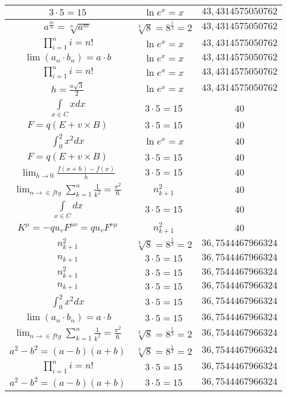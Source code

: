 \documentclass{article}
\begin{document}
\begin{flushleft}
\begin{longtable}{|c|c|c|}
$3\cdot 5=15$ & $\ln e^x=x$ & $43,4314575050762$ \\ \hline 
$a^{\frac{m}{n}}=\sqrt[n]{a^{m}}$ & $\sqrt[3]{8}=8^{\frac{1}{3}}=2$ & $43,4314575050762$ \\ \hline 
$\prod_{i=1}^ni=n!$ & $\ln e^x=x$ & $43,4314575050762$ \\ \hline 
$\lim\left(a_n\cdot b_n\right)=a\cdot b$ & $\ln e^x=x$ & $43,4314575050762$ \\ \hline 
$\prod_{i=1}^ni=n!$ & $\ln e^x=x$ & $43,4314575050762$ \\ \hline 
$h=\frac{a\sqrt{3}}{2}$ & $\ln e^x=x$ & $43,4314575050762$ \\ \hline 
$\int \limits_{x\in C}xdx$ & $3\cdot 5=15$ & $40$ \\ \hline 
$F=q\left(E+v\times B\right)$ & $3\cdot 5=15$ & $40$ \\ \hline 
$\int _0^2x^2dx$ & $\ln e^x=x$ & $40$ \\ \hline 
$F=q\left(E+v\times B\right)$ & $3\cdot 5=15$ & $40$ \\ \hline 
$\lim_{h\to0}\frac{f(x+h)-f(x)}{h}$ & $3\cdot 5=15$ & $40$ \\ \hline 
$\lim_{n\to\in fty}\sum_{k=1}^n\frac{1}{k^2}=\frac{\pi^2}{6}$ & $n_{k+1}^2$ & $40$ \\ \hline 
$\int \limits_{x\in C}dx$ & $3\cdot 5=15$ & $40$ \\ \hline 
$K^\mu=-qu_vF^{\mu\nu}=qu_vF^{\nu\mu}$ & $n_{k+1}^2$ & $40$ \\ \hline 
$n_{k+1}^2$ & $\sqrt[3]{8}=8^{\frac{1}{3}}=2$ & $36,7544467966324$ \\ \hline 
$n_{k+1}$ & $3\cdot 5=15$ & $36,7544467966324$ \\ \hline 
$n_{k+1}^2$ & $3\cdot 5=15$ & $36,7544467966324$ \\ \hline 
$n_{k+1}$ & $3\cdot 5=15$ & $36,7544467966324$ \\ \hline 
$\int _0^2x^2dx$ & $3\cdot 5=15$ & $36,7544467966324$ \\ \hline 
$\lim\left(a_n\cdot b_n\right)=a\cdot b$ & $3\cdot 5=15$ & $36,7544467966324$ \\ \hline 
$\lim_{n\to\in fty}\sum_{k=1}^n\frac{1}{k^2}=\frac{\pi^2}{6}$ & $\sqrt[3]{8}=8^{\frac{1}{3}}=2$ & $36,7544467966324$ \\ \hline 
$a^2-b^2=(a-b)(a+b)$ & $\sqrt[3]{8}=8^{\frac{1}{3}}=2$ & $36,7544467966324$ \\ \hline 
$\prod_{i=1}^ni=n!$ & $3\cdot 5=15$ & $36,7544467966324$ \\ \hline 
$a^2-b^2=(a-b)(a+b)$ & $3\cdot 5=15$ & $36,7544467966324$ \\ \hline 

\end{longtable}
\end{flushleft}
\end{document}
